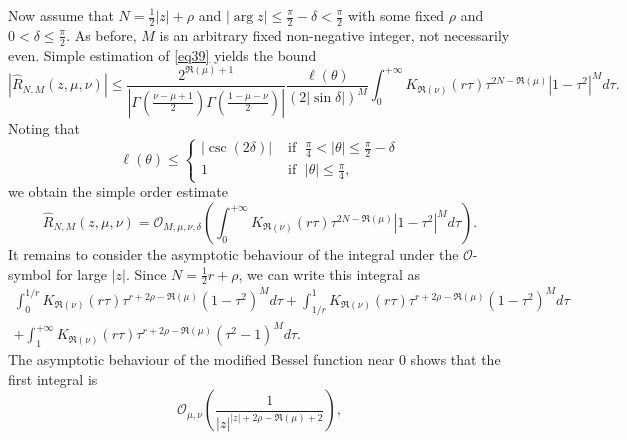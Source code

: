 \documentclass[a4paper,twoside,10pt]{amsart}
\numberwithin{equation}{section}
\begin{document}
Now assume that $N=\frac{1}{2}\left|z\right| +\rho$ and $\left|\arg z\right|\leq \frac{\pi}{2}-\delta <\frac{\pi}{2}$ with some fixed $\rho$ and $0<\delta \leq \frac{\pi}{2}$. As before, $M$ is an arbitrary fixed non-negative integer, not necessarily even. Simple estimation of \eqref{eq39} yields the bound
\[
\left| {\widehat R_{N,M} \left( {z,\mu ,\nu } \right)} \right| \le \frac{{2^{\Re \left( \mu  \right) + 1} }}{{\left| {\Gamma \left( {\frac{{\nu  - \mu  + 1}}{2}} \right)\Gamma \left( {\frac{{1 - \mu  - \nu }}{2}} \right)} \right|}}\frac{{\ell \left( \theta  \right)}}{{\left( {2\left| {\sin \delta } \right|} \right)^M }}\int_0^{ + \infty } {K_{\Re \left( \nu  \right)} \left( {r\tau } \right)\tau ^{2N - \Re \left( \mu  \right)} \left| {1 - \tau ^2 } \right|^M d\tau } .
\]
Noting that
\[
\ell \left( \theta  \right) \leq \begin{cases} \left|\csc \left(2\delta\right) \right| & \text{ if } \; \frac{\pi}{4} < \left|\theta\right| \leq \frac{\pi}{2}-\delta \\ 1 & \text{ if } \; \left|\theta\right| \leq \frac{\pi}{4} , \end{cases} 
\]
we obtain the simple order estimate
\begin{equation}\label{eq51}
\widehat R_{N,M} \left( {z,\mu ,\nu } \right) = \mathcal{O}_{M,\mu ,\nu ,\delta } \left( {\int_0^{ + \infty } {K_{\Re \left( \nu  \right)} \left( {r\tau } \right)\tau ^{2N - \Re \left( \mu  \right)} \left| {1 - \tau ^2 } \right|^M d\tau } } \right).
\end{equation}
It remains to consider the asymptotic behaviour of the integral under the $\mathcal{O}$-symbol for large $\left|z\right|$. Since $N=\frac{1}{2}r +\rho$, we can write this integral as
\begin{multline*}
\int_0^{1/r} {K_{\Re \left( \nu  \right)} \left( {r\tau } \right)\tau ^{r + 2\rho  - \Re \left( \mu  \right)} \left( {1 - \tau ^2 } \right)^M d\tau }  + \int_{1/r}^1 {K_{\Re \left( \nu  \right)} \left( {r\tau } \right)\tau ^{r + 2\rho  - \Re \left( \mu  \right)} \left( {1 - \tau ^2 } \right)^M d\tau } \\ + \int_1^{ + \infty } {K_{\Re \left( \nu  \right)} \left( {r\tau } \right)\tau ^{r + 2\rho  - \Re \left( \mu  \right)} \left( {\tau ^2  - 1} \right)^M d\tau } .
\end{multline*}
The asymptotic behaviour of the modified Bessel function near $0$ shows that the first integral is
\begin{equation}\label{eq50}
\mathcal{O}_{\mu ,\nu } \left( {\frac{1}{{\left| z \right|^{\left| z \right| + 2\rho  - \Re \left( \mu  \right) + 2} }}} \right),
\end{equation}
\end{document}
